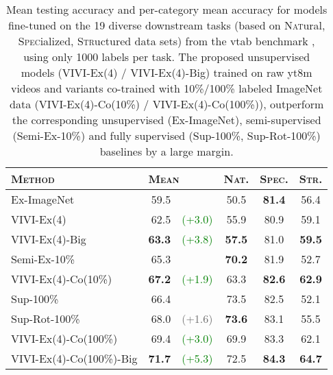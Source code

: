 \documentclass[10pt,twocolumn,letterpaper]{article}
\begin{document}
\begin{table}[t]
    \begin{minipage}{\columnwidth}
    \centering
    \small
    \small
\setlength{\tabcolsep}{3pt}
\setlength{\extrarowheight}{5pt}
\renewcommand{\arraystretch}{0.75}
\newcommand{\green}[1]{\textcolor{Green}{(#1)}}
\begin{tabular}{lrlccc}
\toprule
\textsc{Method}                     & \multicolumn{2}{l}{\textsc{Mean}}                          & \textsc{Nat.} & \textsc{Spec.} & \textsc{Str.} \\
\midrule
Ex-ImageNet                         & 59.5          &                          & 50.5          & \bf 81.4       & 56.4 \\
VIVI-Ex(4)                          & 62.5          & \green{+3.0}                   & 55.9          & 80.9           & 59.1 \\
VIVI-Ex(4)-Big                      & \bf 63.3      & \green{+3.8}                   & \bf 57.5      & 81.0           & \bf 59.5 \\
          \midrule
Semi-Ex-10\%~\cite{zhai2019visual}  & 65.3          &                          & \bf 70.2      & 81.9           & 52.7 \\
VIVI-Ex(4)-Co(10\%)                 & \bf 67.2      & \green{+1.9}                   & 63.3          & \bf 82.6       & \bf 62.9 \\
          \midrule
Sup-100\%~\cite{zhai2019visual}     & 66.4          &                          & 73.5          & 82.5           & 52.1 \\
Sup-Rot-100\%~\cite{zhai2019visual} & 68.0          & \textcolor{DimGray}{(+1.6)} & \bf 73.6      & 83.1           & 55.5 \\
VIVI-Ex(4)-Co(100\%)                & 69.4          & \green{+3.0}                   & 69.9          & 83.3           & 62.1 \\
VIVI-Ex(4)-Co(100\%)-Big            & \bf 71.7      & \green{+5.3}                    & 72.5          & \bf 84.3       & \bf 64.7 \\
\bottomrule
\end{tabular}
     \caption[cotrain-caption]{Mean testing accuracy and per-category mean accuracy for models fine-tuned on the 19 diverse downstream tasks (based on \textsc{Nat}ural, \textsc{Spec}ialized, \textsc{Str}uctured data sets) from the \gls{vtab} benchmark \cite{zhai2019visual}\footnotemark, using only 1000 labels per task. The proposed unsupervised models (VIVI-Ex(4) / VIVI-Ex(4)-Big) trained on raw \gls{yt8m} videos and variants co-trained with 10\%/100\% labeled ImageNet data (VIVI-Ex(4)-Co(10\%) / VIVI-Ex(4)-Co(100\%)), outperform the corresponding unsupervised (Ex-ImageNet), semi-supervised (Semi-Ex-10\%) and fully supervised (Sup-100\%, Sup-Rot-100\%) baselines by a large margin.}
    \label{tab:cotraining}
    \end{minipage}
\end{table}
\end{document}
